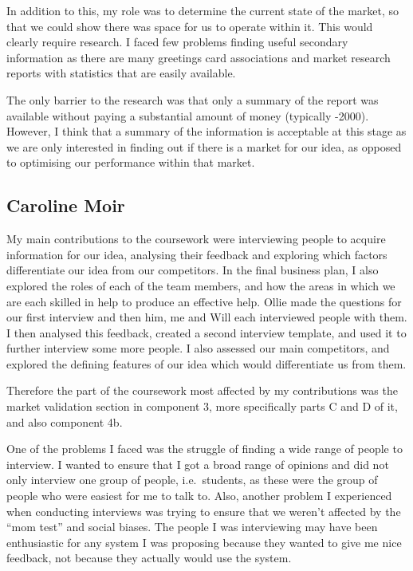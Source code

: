 \documentclass[10pt,a4paper]{article}
\begin{document}
\begin{appendices}
In addition to this, my role was to determine the current state of the market, so that we could show there was space for us to operate within it. This would clearly require research. I faced few problems finding useful secondary information as there are many greetings card associations and market research reports with statistics that are easily available.

The only barrier to the research was that only a summary of the report was available without paying a substantial amount of money (typically -2000). However, I think that a summary of the information is acceptable at this stage as we are only interested in finding out if there is a market for our idea, as opposed to optimising our performance within that market.

\clearpage
\subsection{Caroline Moir}\label{subsec:carolineMoir}
My main contributions to the coursework were interviewing people to acquire information for our idea, analysing their feedback and exploring which factors differentiate our idea from our competitors. In the final business plan, I also explored the roles of each of the team members, and how the areas in which we are each skilled in help to produce an effective help. Ollie made the questions for our first interview and then him, me and Will each interviewed people with them. I then analysed this feedback, created a second interview template, and used it to further interview some more people. I also assessed our main competitors, and explored the defining features of our idea which would differentiate us from them.

Therefore the part of the coursework most affected by my contributions was the market validation section in component 3, more specifically parts C and D of it, and also component 4b.

One of the problems I faced was the struggle of finding a wide range of people to interview. I wanted to ensure that I got a broad range of opinions and did not only interview one group of people, i.e.\ students, as these were the group of people who were easiest for me to talk to. Also, another problem I experienced when conducting interviews was trying to ensure that we weren't affected by the ``mom test'' and social biases. The people I was interviewing may have been enthusiastic for any system I was proposing because they wanted to give me nice feedback, not because they actually would use the system.


\end{appendices}
\end{document}
